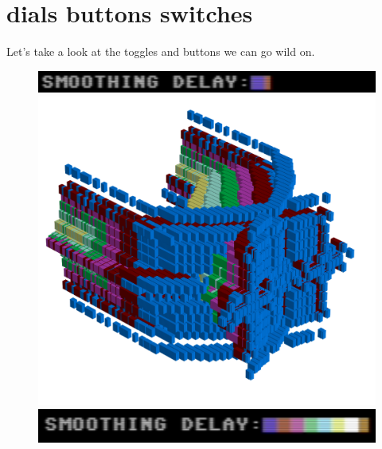 \chapter{dials buttons switches} 
\label{sec:dials}
Let's take a look at the toggles and buttons we can go wild on.
\begin{figure}[H]
    \centering
    \begin{adjustbox}{width=3cm,margin=11cm -12cm}
      \includegraphics[width=12cm]{src/delay/delay-low.png}%
    \end{adjustbox}
    \begin{adjustbox}{width=10.5cm,center}
      \includegraphics[width=12cm]{src/delay/pattern0-45.png}%
    \end{adjustbox}
    \begin{adjustbox}{width=3cm,margin=11cm -12cm}
      \includegraphics[width=12cm]{src/delay/delay-high.png}%
    \end{adjustbox}
    \begin{adjustbox}{width=10.5cm,margin=0cm -2cm}

\end{adjustbox}
\end{figure}
